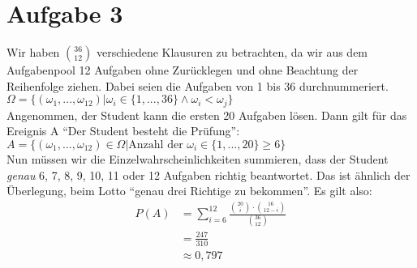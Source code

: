 \documentclass[10pt,a4paper]{article}
\begin{document}
\section*{Aufgabe 3}
Wir haben $\binom{36}{12}$ verschiedene Klausuren zu betrachten, da wir aus dem Aufgabenpool 12 Aufgaben ohne Zurücklegen und ohne Beachtung der Reihenfolge ziehen. Dabei seien die Aufgaben von 1 bis 36 durchnummeriert.\\
$\Omega = \{(\omega_{1},...,\omega_{12}) | \omega_{i} \in \{1,...,36\} \wedge \omega_{i} < \omega_{j} \}$ \\
Angenommen, der Student kann die ersten 20 Aufgaben lösen. Dann gilt für das Ereignis A ``Der Student besteht die Prüfung'':\\
$A = \{(\omega_{1},...,\omega_{12}) \in \Omega | \text{Anzahl der }\omega_{i} \in \{1,...,20\} \geq 6 \}$ \\
Nun müssen wir die Einzelwahrscheinlichkeiten summieren, dass der Student \textit{genau} 6, 7, 8, 9, 10, 11 oder 12 Aufgaben richtig beantwortet. Das ist ähnlich der Überlegung, beim Lotto ``genau drei Richtige zu bekommen''. Es gilt also:\\
\begin{align*}
	P(A) &= \sum_{i=6}^{12} \frac{\binom{20}{i} \cdot \binom{16}{12 - i}}{\binom{36}{12}}\\
	&= \frac{247}{310}\\
	&\approx 0,797
\end{align*}
\end{document}
